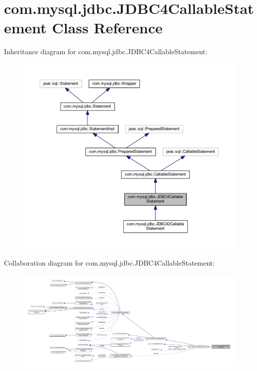 \hypertarget{classcom_1_1mysql_1_1jdbc_1_1_j_d_b_c4_callable_statement}{}\section{com.\+mysql.\+jdbc.\+J\+D\+B\+C4\+Callable\+Statement Class Reference}
\label{classcom_1_1mysql_1_1jdbc_1_1_j_d_b_c4_callable_statement}


Inheritance diagram for com.\+mysql.\+jdbc.\+J\+D\+B\+C4\+Callable\+Statement\+:
\nopagebreak
\begin{figure}[H]
\begin{center}
\leavevmode
\includegraphics[width=350pt]{classcom_1_1mysql_1_1jdbc_1_1_j_d_b_c4_callable_statement__inherit__graph}
\end{center}
\end{figure}


Collaboration diagram for com.\+mysql.\+jdbc.\+J\+D\+B\+C4\+Callable\+Statement\+:
\nopagebreak
\begin{figure}[H]
\begin{center}
\leavevmode
\includegraphics[width=350pt]{classcom_1_1mysql_1_1jdbc_1_1_j_d_b_c4_callable_statement__coll__graph}
\end{center}
\end{figure}
